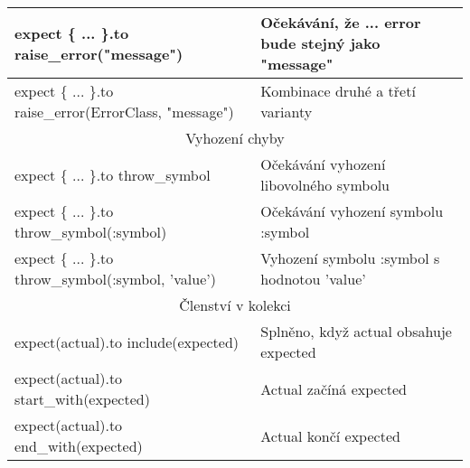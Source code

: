 \begin{longtable}{| p{} | p{} |}
 \hline
 expect \{ ... \}.to raise\_error("message") & Očekávání, že ... error bude stejný jako "message" \\
 \hline
 expect \{ ... \}.to raise\_error(ErrorClass, "message")  & Kombinace druhé a třetí varianty \\
 \hline
 \multicolumn{2}{||c||}{Vyhození chyby}\\
 \hline\hline
 expect \{ ... \}.to throw\_symbol & Očekávání vyhození libovolného symbolu\\ 
 \hline
 expect \{ ... \}.to throw\_symbol(:symbol) & Očekávání vyhození symbolu :symbol\\ 
 \hline
 expect \{ ... \}.to throw\_symbol(:symbol, 'value') & Vyhození symbolu :symbol s hodnotou 'value'\\ 
 \hline
 \multicolumn{2}{||c||}{Členství v kolekci}\\
 \hline\hline
 expect(actual).to include(expected) & Splněno, když actual obsahuje expected \\
 \hline
 expect(actual).to start\_with(expected) & Actual začíná expected \\
 \hline
 expect(actual).to end\_with(expected) & Actual končí expected \\
 \hline
 \hline
\end{longtable}

%
%
%
%
